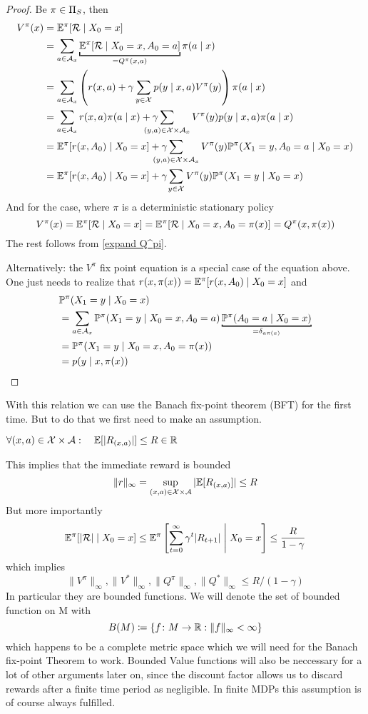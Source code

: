 \begin{proof} Be \(\pi\in\Pi_S\), then
	\begin{align}
		V^\pi(x)&=\E^\pi[\cR\mid X_0=x] \nonumber\\
		&=\sum_{a\in\cA_x} 
		\underbracket[1pt]{\E^\pi[\cR\mid X_0=x, A_0=a]}_{=Q^\pi(x,a)}\label{stoch pi: V^pi in terms of Q^pi}
		\pi(a\mid x)\\
		&=\sum_{a\in\cA_x} \left(r(x,a)
		+\gamma\sum_{y\in\cX}p(y\mid x,a)V^\pi(y)\right)\pi(a\mid x)\nonumber\\
		&=\sum_{a\in\cA_x}r(x,a)\pi(a\mid x) 
		+ \gamma\smashoperator[l]{\sum_{(y,a)\in\cX\times\cA_x}} 
		V^\pi(y) p(y\mid x,a)\pi(a\mid x)
		\label{stoch pi: fixpoint proof}\\
		&=\E^\pi[r(x,A_0)\mid X_0=x] 
		+ \gamma\smashoperator[l]{\sum_{(y,a)\in\cX\times\cA_x}} V^\pi(y)
		\Pr^\pi(X_1=y, A_0=a \mid X_0=x)\nonumber\\
		&=\E^\pi[r(x,A_0)\mid X_0=x] + \gamma\smashoperator[l]{\sum_{y\in\cX}} V^\pi(y)
		\Pr^\pi(X_1=y\mid X_0=x)\nonumber
	\end{align}
	And for the case, where \(\pi\) is a deterministic stationary policy
	\[
		V^\pi(x)=\mathbb{E}^\pi[\mathcal{R}\mid X_0=x]=\mathbb{E}^\pi[\mathcal{R}\mid X_0=x, A_0=\pi(x)]=Q^\pi(x,\pi(x))
	\]
	The rest follows from \ref{expand Q^pi}. 
	
	Alternatively: the \(V^\pi\) fix point equation is a special case of the equation above. One just needs to realize that \(r(x,\pi(x)) = \mathbb{E}^\pi[r(x,A_0)\mid X_0=x]\) and
	\begin{align*}
		&\Pr^\pi(X_1=y\mid X_0=x)\\
		&=\sum_{a\in\cA_x} \Pr^\pi(X_1=y\mid X_0=x, A_0=a) 
		\underbracket[1pt][1pt]{\Pr^\pi(A_0=a\mid X_0=x)}_{=\delta_{a\pi(x)}}\\
		&=\Pr^\pi(X_1=y\mid X_0=x, A_0=\pi(x))\\
		&=p(y\mid x,\pi(x))\qedhere
	\end{align*}
\end{proof}

With this relation we can use the Banach fix-point theorem (BFT) for the first time. But to do that we first need to make an assumption.
\begin{assumption} 
	\(\forall (x,a)\in\mathcal{X}\times\mathcal{A}:\quad\mathbb{E}[|R_{(x,a)}|]\le R\in\mathbb{R}\)
\end{assumption}
This implies that the immediate reward is bounded
\[
	\|r\|_{\infty}=\sup_{(x,a)\in\mathcal{X}\times\mathcal{A}}|\mathbb{E}[R_{(x,a)}]|\le R
\]
But more importantly
\[
	\mathbb{E}^\pi[|\mathcal{R}| \mid X_0 = x]\le\mathbb{E}^\pi\left[\sum_{t=0}^\infty \gamma^t |R_{t+1}| \;\middle|\; X_0=x \right]
	\le \frac{R}{1-\gamma} 
\]
which implies 
\[
	\|V^\pi\|_\infty,\|V^*\|_\infty, \|Q^\pi\|_\infty,\|Q^*\|_\infty \le R/(1-\gamma)
\]
In particular they are bounded functions. We will denote the set of bounded function on M with 
\[
	B(M)\coloneqq \{f\colon M\to\mathbb{R} : \|f\|_\infty <\infty \} 
\]
which happens to be a complete metric space which we will need for the Banach fix-point Theorem to work. Bounded Value functions will also be neccessary for a lot of other arguments later on, since the discount factor allows us to discard rewards after a finite time period as negligible.  In finite MDPs this assumption is of course always fulfilled. 


